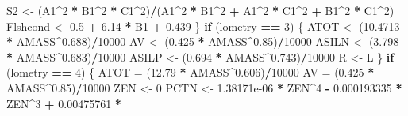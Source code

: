 \documentclass[]{article}
\newenvironment{Shaded}{\begin{snugshade}}{\end{snugshade}}
\newcommand{\DecValTok}[1]{\textcolor[rgb]{0.00,0.00,0.81}{#1}}
\newcommand{\FloatTok}[1]{\textcolor[rgb]{0.00,0.00,0.81}{#1}}
\newcommand{\StringTok}[1]{\textcolor[rgb]{0.31,0.60,0.02}{#1}}
\newcommand{\ControlFlowTok}[1]{\textcolor[rgb]{0.13,0.29,0.53}{\textbf{#1}}}
\newcommand{\OperatorTok}[1]{\textcolor[rgb]{0.81,0.36,0.00}{\textbf{#1}}}
\newcommand{\NormalTok}[1]{#1}
\begin{document}
\begin{Shaded}
\begin{Highlighting}[]
\NormalTok{        S2 <-}\StringTok{ }\NormalTok{(A1}\OperatorTok{^}\DecValTok{2} \OperatorTok{*}\StringTok{ }\NormalTok{B1}\OperatorTok{^}\DecValTok{2} \OperatorTok{*}\StringTok{ }\NormalTok{C1}\OperatorTok{^}\DecValTok{2}\NormalTok{)}\OperatorTok{/}\NormalTok{(A1}\OperatorTok{^}\DecValTok{2} \OperatorTok{*}\StringTok{ }\NormalTok{B1}\OperatorTok{^}\DecValTok{2} \OperatorTok{+}\StringTok{ }\NormalTok{A1}\OperatorTok{^}\DecValTok{2} \OperatorTok{*}\StringTok{ }\NormalTok{C1}\OperatorTok{^}\DecValTok{2} \OperatorTok{+}\StringTok{ }
\StringTok{            }\NormalTok{B1}\OperatorTok{^}\DecValTok{2} \OperatorTok{*}\StringTok{ }\NormalTok{C1}\OperatorTok{^}\DecValTok{2}\NormalTok{)}
\NormalTok{        Flshcond <-}\StringTok{ }\FloatTok{0.5} \OperatorTok{+}\StringTok{ }\FloatTok{6.14} \OperatorTok{*}\StringTok{ }\NormalTok{B1 }\OperatorTok{+}\StringTok{ }\FloatTok{0.439}
\NormalTok{    \}}
    \ControlFlowTok{if}\NormalTok{ (lometry }\OperatorTok{==}\StringTok{ }\DecValTok{3}\NormalTok{) \{}
\NormalTok{        ATOT <-}\StringTok{ }\NormalTok{(}\FloatTok{10.4713} \OperatorTok{*}\StringTok{ }\NormalTok{AMASS}\OperatorTok{^}\FloatTok{0.688}\NormalTok{)}\OperatorTok{/}\DecValTok{10000}
\NormalTok{        AV <-}\StringTok{ }\NormalTok{(}\FloatTok{0.425} \OperatorTok{*}\StringTok{ }\NormalTok{AMASS}\OperatorTok{^}\FloatTok{0.85}\NormalTok{)}\OperatorTok{/}\DecValTok{10000}
\NormalTok{        ASILN <-}\StringTok{ }\NormalTok{(}\FloatTok{3.798} \OperatorTok{*}\StringTok{ }\NormalTok{AMASS}\OperatorTok{^}\FloatTok{0.683}\NormalTok{)}\OperatorTok{/}\DecValTok{10000}
\NormalTok{        ASILP <-}\StringTok{ }\NormalTok{(}\FloatTok{0.694} \OperatorTok{*}\StringTok{ }\NormalTok{AMASS}\OperatorTok{^}\FloatTok{0.743}\NormalTok{)}\OperatorTok{/}\DecValTok{10000}
\NormalTok{        R <-}\StringTok{ }\NormalTok{L}
\NormalTok{    \}}
    \ControlFlowTok{if}\NormalTok{ (lometry }\OperatorTok{==}\StringTok{ }\DecValTok{4}\NormalTok{) \{}
\NormalTok{        ATOT =}\StringTok{ }\NormalTok{(}\FloatTok{12.79} \OperatorTok{*}\StringTok{ }\NormalTok{AMASS}\OperatorTok{^}\FloatTok{0.606}\NormalTok{)}\OperatorTok{/}\DecValTok{10000}
\NormalTok{        AV =}\StringTok{ }\NormalTok{(}\FloatTok{0.425} \OperatorTok{*}\StringTok{ }\NormalTok{AMASS}\OperatorTok{^}\FloatTok{0.85}\NormalTok{)}\OperatorTok{/}\DecValTok{10000}
\NormalTok{        ZEN <-}\StringTok{ }\DecValTok{0}
\NormalTok{        PCTN <-}\StringTok{ }\FloatTok{1.38171e-06} \OperatorTok{*}\StringTok{ }\NormalTok{ZEN}\OperatorTok{^}\DecValTok{4} \OperatorTok{-}\StringTok{ }\FloatTok{0.000193335} \OperatorTok{*}\StringTok{ }\NormalTok{ZEN}\OperatorTok{^}\DecValTok{3} \OperatorTok{+}\StringTok{ }\FloatTok{0.00475761} \OperatorTok{*}\StringTok{ }

\end{Highlighting}
\end{Shaded}
\end{document}
